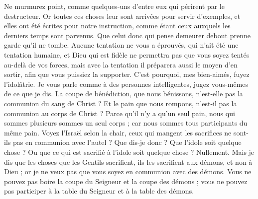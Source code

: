 \begin{multicols}{2}
Ne murmurez point, comme quelques-uns d'entre eux qui périrent par le destructeur.
Or toutes ces choses leur sont arrivées pour servir d'exemples, et elles ont été écrites pour notre instruction, comme étant ceux auxquels les derniers temps sont parvenus.
Que celui donc qui pense demeurer debout prenne garde qu'il ne tombe.
Aucune tentation ne vous a éprouvés, qui n'ait été une tentation humaine, et Dieu qui est fidèle ne permettra pas que vous soyez tentés au-delà de vos forces, mais avec la tentation il préparera aussi le moyen d'en sortir, afin que vous puissiez la supporter.
C'est pourquoi, mes bien-aimés, fuyez l'idolâtrie.
Je vous parle comme à des personnes intelligentes, jugez vous-mêmes de ce que je dis.
La coupe de bénédiction, que nous bénissons, n'est-elle pas la communion du sang de Christ ? Et le pain que nous rompons, n'est-il pas la communion au corps de Christ ?
Parce qu'il n'y a qu'un seul pain, nous qui sommes plusieurs sommes un seul corps ; car nous sommes tous participants du même pain.
Voyez l'Israël selon la chair, ceux qui mangent les sacrifices ne sont-ils pas en communion avec l'autel ?
Que dis-je donc ? Que l'idole soit quelque chose ? Ou que ce qui est sacrifié à l'idole soit quelque chose ? Nullement.
Mais je dis que les choses que les Gentils sacrifient, ils les sacrifient aux démons, et non à Dieu ; or je ne veux pas que vous soyez en communion avec des démons.
Vous ne pouvez pas boire la coupe du Seigneur et la coupe des démons ; vous ne pouvez pas participer à la table du Seigneur et à la table des démons.

\end{multicols}
